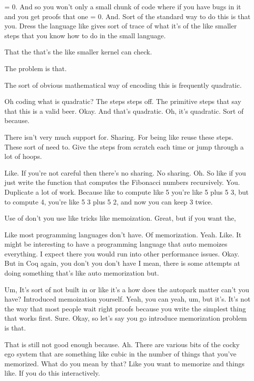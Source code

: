 \begin{subappendices}
    = 0. And so you won't only a small chunk of code where if you have bugs in it and you get proofs that one = 0. And. Sort of the standard way to do this is that you. Dress the language like gives sort of trace of what it's of the like smaller steps that you know how to do in the small language. 
    
    That the that's the like smaller kernel can check. 
    
    The problem is that. 
    
    The sort of obvious mathematical way of encoding this is frequently quadratic. 
    
    Oh coding what is quadratic? The steps steps off. The primitive steps that say that this is a valid beer. Okay. And that's quadratic. Oh, it's quadratic. Sort of because. 
    
    There isn't very much support for. Sharing. For being like reuse these steps. These sort of need to. Give the steps from scratch each time or jump through a lot of hoops. 
    
    Like. If you're not careful then there's no sharing. No sharing. Oh. So like if you just write the function that computes the Fibonacci numbers recursively. You. Duplicate a lot of work. Because like to compute like 5 you're like 5 plus 5 3, but to compute 4, you're like 5 3 plus 5 2, and now you can keep 3 twice. 
    
    Use of don't you use like tricks like memoization. Great, but if you want the, 
    
    Like most programming languages don't have. Of memorization. Yeah. Like. It might be interesting to have a programming language that auto memoizes everything. I expect there you would run into other performance issues. Okay. But in Coq again, you don't you don't have I mean, there is some attempts at doing something that's like auto memorization but. 
    
    Um, It's sort of not built in or like it's a how does the autopark matter can't you have? Introduced memoization yourself. Yeah, you can yeah, um, but it's. It's not the way that most people wait right proofs because you write the simplest thing that works first. Sure. Okay, so let's say you go introduce memorization problem is that. 
    
    That is still not good enough because. Ah. There are various bits of the cocky ego system that are something like cubic in the number of things that you've memorized. What do you mean by that? Like you want to memorize and things like. If you do this interactively. 
    

\end{subappendices}
